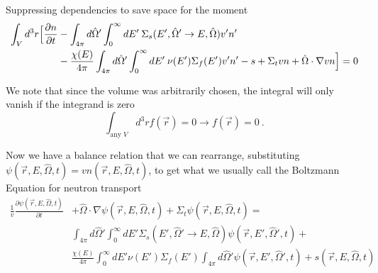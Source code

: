 \documentclass[12pt]{article}
\newlength{\up}
\newcommand{\vOmega}{\ensuremath{\hat{\Omega}}}
\begin{document}
Suppressing dependencies to save space for the moment
%
\begin{align}
\int_V d^3r \Bigl[\frac{\partial n}{\partial t} &- 
\int_{4\pi} d\vOmega' \int_0^{\infty} dE' \:\Sigma_s(E', \vOmega' \rightarrow E, \vOmega) v' n' \nonumber\\&-
\frac{\chi(E)}{4\pi} \int_{4\pi} d\vOmega' \int_0^{\infty} dE' \:\nu(E') \Sigma_f(E') v' n' -
s +
\Sigma_t v n + 
\vOmega \cdot \nabla v n \Bigr] = 0 \nonumber
\end{align}

We note that since the volume was arbitrarily chosen, the integral will only vanish if the integrand is zero 
\[\int_{\text{any }V} d^3r f(\vec{r}) = 0 \rightarrow f(\vec{r}) = 0 \:.\]

Now we have a balance relation that we can rearrange, substituting $\psi(\vec{r}, E, \vOmega, t) = vn(\vec{r}, E, \vOmega, t)$, to get what we usually call the Boltzmann Equation for neutron transport
%
\begin{align}
\frac{1}{v}\frac{\partial \psi(\vec{r}, E, \vOmega, t)}{\partial t} &+ 
\vOmega \cdot \nabla \psi(\vec{r}, E, \vOmega, t) +
\Sigma_t \psi(\vec{r}, E, \vOmega, t) = \nonumber\\
%
& \int_{4\pi} d\vOmega' \int_0^{\infty} dE' \Sigma_s(E', \vOmega' \rightarrow E, \vOmega) \psi(\vec{r}, E', \vOmega', t)  +\nonumber\\
%
& \frac{\chi(E)}{4\pi} \int_0^{\infty} dE' \nu(E') \Sigma_f(E') \int_{4\pi} d\vOmega' \psi(\vec{r}, E', \vOmega', t) +
s(\vec{r}, E, \vOmega, t) \nonumber
\end{align}

\end{document}
